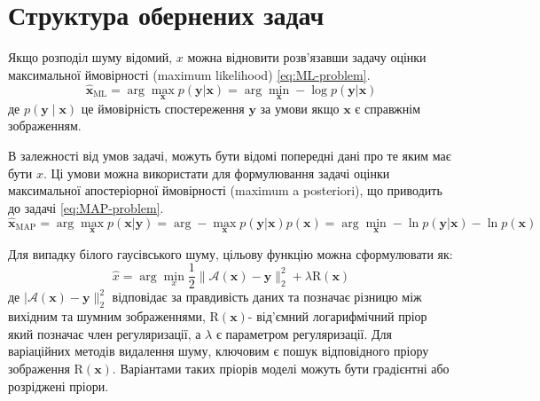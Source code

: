 \documentclass{beamer}
\numberwithin{equation}{section}
\begin{document}
	\section{Структура обернених задач}	
	\begin{frame}
		Якщо розподіл шуму відомий, $x$ можна відновити розв'язавши задачу оцінки максимальної ймовірності (maximum likelihood) \ref{eq:ML-problem}.
		\begin{equation}
			\label{eq:ML-problem}
			\hat{\boldsymbol{x}}_{\mathrm{ML}}
			= \arg \max_{\boldsymbol{x}} {p (\boldsymbol{y} | \boldsymbol{x})}
			= \arg \min_{\boldsymbol{x}} -\log p(\boldsymbol{y} | \boldsymbol{x})
		\end{equation}
		де $p(\boldsymbol{y} \mid \boldsymbol{x})$ це ймовірність спостереження $\boldsymbol{y}$ за умови якщо $\boldsymbol{x}$ є справжнім зображенням.
		
		В залежності від умов задачі, можуть бути відомі попередні дані про те яким має бути $x$. Ці умови можна використати для формулювання задачі оцінки максимальної апостеріорної ймовірності (maximum a posteriori), що приводить до задачі \ref{eq:MAP-problem}.
		\begin{equation}
			\label{eq:MAP-problem}
			\hat{\boldsymbol{x}}_{\mathrm{MAP}}
			=
			\arg \max_{\boldsymbol{x}} p(\boldsymbol{x} | \boldsymbol{y}) 
			=
			\arg -\max_{\boldsymbol{x}} {p(\boldsymbol{y} | \boldsymbol{x})} p(\boldsymbol{x})
			=
			\arg \min_{\boldsymbol{x}} -\ln p(\boldsymbol{y} | \boldsymbol{x})-\ln p(\boldsymbol{x})
		\end{equation}
		
		Для випадку білого гаусівського шуму, цільову функцію можна сформулювати як:
		\begin{equation}
			\label{eq:MAP-avgn}
			\hat{x}=\arg \min_{x} 	\frac{1}{2}\|\mathcal{A}(\boldsymbol{x})-\boldsymbol{y}\|_{2}^{2}+\lambda \mathrm{R}(\boldsymbol{x})
		\end{equation}
		де  $|\mathcal{A}(\boldsymbol{x})-\boldsymbol{y}\|_{2}^{2}$ відповідає за правдивість даних та позначає різницю між вихідним та шумним зображеннями, $\mathrm{R}(\boldsymbol{x})$- від'ємний логарифмічний пріор який позначає член регуляризації, а $\lambda$ є параметром регуляризації. Для варіаційних методів видалення шуму, ключовим є пошук відповідного пріору зображення $\mathrm{R}(\boldsymbol{x})$. Варіантами таких пріорів моделі можуть бути градієнтні або розріджені пріори.
		
	\end{frame}
\end{document}
